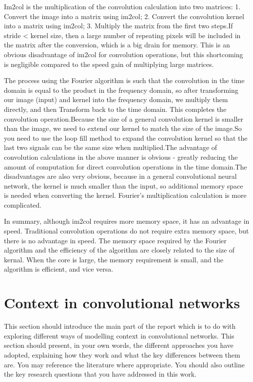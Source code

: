 \documentclass{article}
\begin{document}
Im2col is the multiplication of the convolution calculation into two matrices: 1. Convert the image into a matrix using im2col; 2. Convert the convolution kernel into a matrix using im2col; 3. Multiply the matrix from the first two steps.If stride < kernel size, then a large number of repeating pixels will be included in the matrix after the conversion, which is a big drain for memory. This is an obvious disadvantage of im2col for convolution operations, but this shortcoming is negligible compared to the speed gain of multiplying large matrices.

The process using the Fourier algorithm is such that the convolution in the time domain is equal to the product in the frequency domain, so after transforming our image (input) and kernel into the frequency domain, we multiply them directly, and then Transform back to the time domain. This completes the convolution operation.Because the size of a general convolution kernel is smaller than the image, we need to extend our kernel to match the size of the image.So you need to use the loop fill method to expand the convolution kernel so that the last two signals can be the same size when multiplied.The advantage of convolution calculations in the above manner is obvious - greatly reducing the amount of computation for direct convolution operations in the time domain.The disadvantages are also very obvious, because in a general convolutional neural network, the kernel is much smaller than the input, so additional memory space is needed when converting the kernel. Fourier's multiplication calculation is more complicated.

In summary, although im2col requires more memory space, it has an advantage in speed. Traditional convolution operations do not require extra memory space, but there is no advantage in speed. The memory space required by the Fourier algorithm and the efficiency of the algorithm are closely related to the size of kernal. When the core is large, the memory requirement is small, and the algorithm is efficient, and vice versa.

\section{Context in convolutional networks}
This section should introduce the main part of the report which is to do with exploring different ways of modelling context in convolutional networks.  This section should present, in your own words, the different approaches you have adopted, explaining how they work and what the key differences between them are.  You may reference the literature where appropriate.   You should also outline the key research questions that you have addressed in this work.
\end{document}
